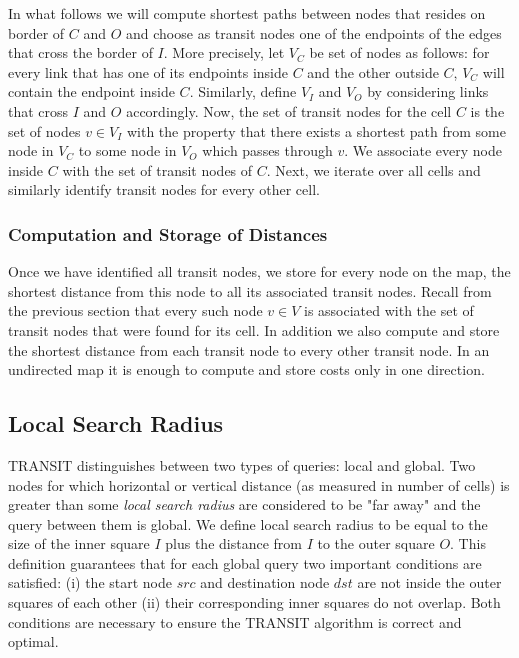\documentclass[runningheads,a4paper]{llncs}
\begin{document}
In what follows we will compute shortest paths between nodes that resides on border of $C$ and $O$ and choose as
transit nodes one of the endpoints of the edges that cross the border of $I$. More precisely, 
let $V_C$ be set of nodes as follows: for every link that has one of its endpoints inside $C$ and the other outside $C$,
$V_C$ will contain the endpoint inside $C$. Similarly, define $V_{I}$ and $V_{O}$ by considering links that cross $I$ and $O$ accordingly.
Now, the set of transit nodes for the cell $C$ is the set of nodes $v \in V_{I}$ with the property that there exists a shortest path from
some node in $V_C$ to some node in $V_{O}$ which passes through $v$. We associate every node inside $C$ with the
set of transit nodes of $C$. Next, we iterate over all cells and similarly identify transit nodes for every other cell.

\subsubsection{Computation and Storage of Distances}
\label{sub:precompute}
Once we have identified all transit nodes, we store for every node on the map, the shortest distance
from this node to all its associated transit nodes.  Recall from the previous section that every
such node $v \in V$ is associated with the set of transit nodes that were found for its cell.  In
addition we also compute and store the shortest distance from each transit node to every other
transit node.  In an undirected map it is enough to compute and store costs only in one direction.

\subsection {Local Search Radius}
\label{sub:local_radius}
TRANSIT distinguishes between two types of queries: local and global.  Two nodes for which
horizontal or vertical distance (as measured in number of cells) is greater than some \emph{local search
radius} are considered to be "far away" and the query between them is global.  We define
local search radius to be equal to the size of the inner square $I$ plus the distance from $I$ to the
outer square $O$.
This definition guarantees that for each global query two important conditions are satisfied:
 (i) the start node $src$ and destination node $dst$ are not inside the outer squares of each other
(ii) their corresponding inner squares do not overlap.
Both conditions are necessary to ensure the TRANSIT algorithm is correct and optimal.
\end{document}
